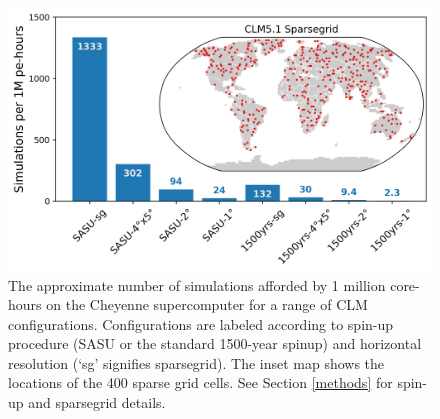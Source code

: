 \documentclass[draft]{agujournal2019}
\begin{document}
\begin{figure}[h]
\centering
\includegraphics[width=30pc]{../figs/main/sims.png}
\caption{The approximate number of simulations afforded by 1 million core-hours on the Cheyenne supercomputer for a range of CLM configurations. Configurations are labeled according to spin-up procedure (SASU or the standard 1500-year spinup) and horizontal resolution (`sg' signifies sparsegrid). The inset map shows the locations of the 400 sparse grid cells. See Section \ref{methods} for spin-up and sparsegrid details.}
\label{fig:sims}
\end{figure}
\end{document}
